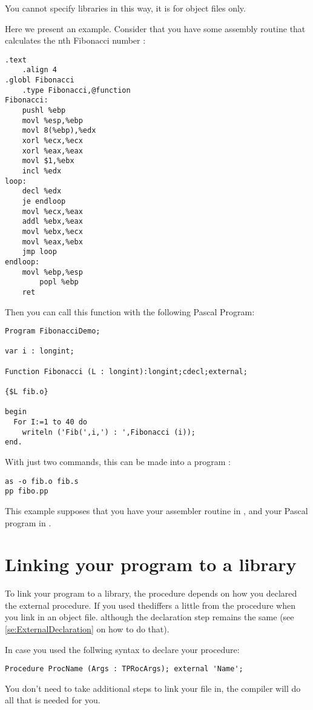 \documentclass{report}
\begin{document}
You cannot specify libraries in this way, it is for object files only.

Here we present an example. Consider that you have some assembly routine that
calculates the nth Fibonacci number :
\begin{verbatim}
.text
	.align 4
.globl Fibonacci
	.type Fibonacci,@function
Fibonacci:
	pushl %ebp
	movl %esp,%ebp
	movl 8(%ebp),%edx
	xorl %ecx,%ecx
	xorl %eax,%eax
	movl $1,%ebx
	incl %edx
loop:
	decl %edx
	je endloop
	movl %ecx,%eax
	addl %ebx,%eax
	movl %ebx,%ecx
	movl %eax,%ebx
	jmp loop
endloop:
	movl %ebp,%esp
        popl %ebp
	ret
\end{verbatim}
Then you can call this function with the following Pascal Program:
\begin{verbatim}
Program FibonacciDemo;

var i : longint;

Function Fibonacci (L : longint):longint;cdecl;external;

{$L fib.o}

begin
  For I:=1 to 40 do
    writeln ('Fib(',i,') : ',Fibonacci (i));
end.
\end{verbatim}
With just two commands, this can be made into a program :
\begin{verbatim}
as -o fib.o fib.s
pp fibo.pp
\end{verbatim}
This example supposes that you have your assembler routine in ,
and your Pascal program in .

\section{Linking your program to a library}
\label{se:LinkOut}
To link your program to a library, the procedure depends on how you declared
the external procedure. If you used thediffers a little from the
procedure when you link in an object file. although the declaration step
remains the same (see \ref{se:ExternalDeclaration} on how to do that).

In case you used the follwing syntax to declare your procedure:
\begin{verbatim}
Procedure ProcName (Args : TPRocArgs); external 'Name';
\end{verbatim}
You don't need to take additional steps to link your file in, the compiler
will do all that is needed for you.
\end{document}
